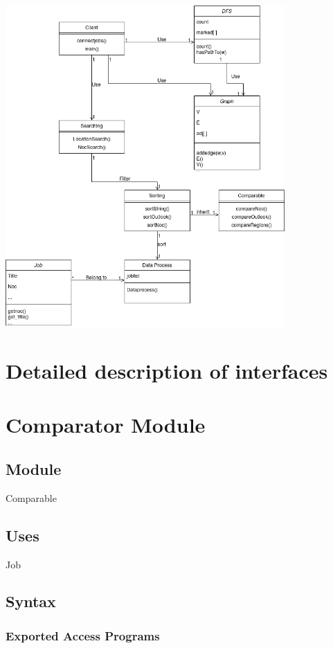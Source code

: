 \documentclass[12pt]{article}
\begin{document}
\begin{center}
\includegraphics[width=0.8\textwidth]{UML Diagram.png}
\end{center}
\newpage
\section{Detailed description of interfaces}
\section* {Comparator Module}

\subsection* {Module}

Comparable

\subsection* {Uses}

Job

\subsection* {Syntax}

\subsubsection* {Exported Access Programs}
\end{document}
